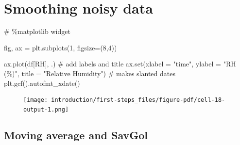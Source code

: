 \documentclass[
  letterpaper,
  DIV=11,
  numbers=noendperiod,
  oneside]{scrreprt}
\newenvironment{Shaded}{\begin{snugshade}}{\end{snugshade}}
\newcommand{\BuiltInTok}[1]{\textcolor[rgb]{0.00,0.23,0.31}{#1}}
\newcommand{\CommentTok}[1]{\textcolor[rgb]{0.37,0.37,0.37}{#1}}
\newcommand{\DecValTok}[1]{\textcolor[rgb]{0.68,0.00,0.00}{#1}}
\newcommand{\NormalTok}[1]{\textcolor[rgb]{0.00,0.23,0.31}{#1}}
\newcommand{\OperatorTok}[1]{\textcolor[rgb]{0.37,0.37,0.37}{#1}}
\newcommand{\StringTok}[1]{\textcolor[rgb]{0.13,0.47,0.30}{#1}}
\begin{document}
\hypertarget{smoothing-noisy-data-1}{%
\section{Smoothing noisy data}\label{smoothing-noisy-data-1}}

\begin{Shaded}
\begin{Highlighting}[]
\CommentTok{\# \%matplotlib widget}

\NormalTok{fig, ax }\OperatorTok{=}\NormalTok{ plt.subplots(}\DecValTok{1}\NormalTok{, figsize}\OperatorTok{=}\NormalTok{(}\DecValTok{8}\NormalTok{,}\DecValTok{4}\NormalTok{))}

\NormalTok{ax.plot(df[}\StringTok{\textquotesingle{}RH\textquotesingle{}}\NormalTok{], }\StringTok{\textquotesingle{}.\textquotesingle{}}\NormalTok{)}
\CommentTok{\# add labels and title}
\NormalTok{ax.}\BuiltInTok{set}\NormalTok{(xlabel }\OperatorTok{=} \StringTok{"time"}\NormalTok{,}
\NormalTok{       ylabel }\OperatorTok{=} \StringTok{"RH (\%)"}\NormalTok{,}
\NormalTok{       title }\OperatorTok{=} \StringTok{"Relative Humidity"}\NormalTok{)}
\CommentTok{\# makes slanted dates}
\NormalTok{plt.gcf().autofmt\_xdate()  }
\end{Highlighting}
\end{Shaded}

\begin{figure}[H]

{\centering \texttt{[image: introduction/first-steps\_files/figure-pdf/cell-18-output-1.png]}

}

\end{figure}

\hypertarget{moving-average-and-savgol}{%
\subsection{Moving average and SavGol}\label{moving-average-and-savgol}}
\end{document}
